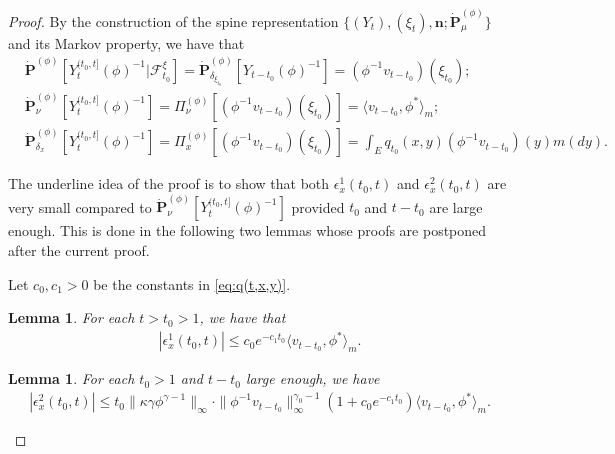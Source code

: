 \documentclass[12pt,a4paper]{amsart}
\newtheorem{lem}[thm]{Lemma}
\theoremstyle{definition}
\numberwithin{equation}{section}
\begin{document}
\begin{proof}
By the construction of the spine representation $\{(Y_t), (\xi_t),\mathbf n; \dot {\mathbf P}^{(\phi)}_\mu\}$ and its Markov property, we have that
\begin{align}
	\label{eq: some equations for PY-1-1}
	&\dot{\mathbf P}^{(\phi)} [Y_t^{(t_0,t]}(\phi)^{-1}|\mathscr F^\xi_{t_0}]
   = \dot{\mathbf P}_{\delta_{\xi_{t_0}}}^{(\phi)}  [Y_{t-t_0}(\phi)^{-1}]
   = (\phi^{-1}v_{t-t_0})(\xi_{t_0});
	\\ \label{eq: some equations for PY-1-2}
	&\dot{\mathbf P}_\nu^{(\phi)}[Y_t^{(t_0,t]}(\phi)^{-1}]
   = \Pi_{\nu}^{(\phi)}[(\phi^{-1}v_{t-t_0})(\xi_{t_0}) ]
   = \langle v_{t-t_0},\phi^* \rangle_m;
	\\ \label{eq: some equations for PY-1-3}
	&\dot{\mathbf P}_{\delta_x}^{(\phi)}[Y_t^{(t_0,t]}(\phi)^{-1}]
   = \Pi_x^{(\phi)}[(\phi^{-1}v_{t-t_0})(\xi_{t_0}) ]
   = \int_E  q_{t_0}(x,y)(\phi^{-1}v_{t-t_0})(y) m(dy).
\end{align}

The underline idea of the proof is to show that both $\epsilon_x^1(t_0,t)$ and $\epsilon_x^2(t_0,t)$ are very small compared to $\dot {\mathbf P}_\nu^{(\phi)}[Y_t^{(t_0,t]}(\phi)^{-1}]$ provided $t_0$ and $t- t_0$ are large enough.
This is done in the following two lemmas whose proofs are postponed after the current proof.


Let $c_0, c_1>0$ be the constants in \eqref{eq:q(t,x,y)}.
\begin{lem}
  \label{lem:bound_for_epsilon1}
  For each $t > t_0 > 1$, we have that
  \begin{align}
    |\epsilon_x^1(t_0,t)|
    \leq c_0 e^{-c_1 t_0}\langle v_{t-t_0},\phi^* \rangle_m.
  \end{align}
\end{lem}

\begin{lem}
  \label{lem:upperbound_of_epsilon-2}
  For each $t_0 > 1$ and $t - t_0$ large enough, we have
  \begin{align}
    \label{eq:upperbound_of_epsilon-2}
    |\epsilon_x^2(t_0,t)|
    \leq t_0\|\kappa\gamma\phi^{\gamma - 1}\|_{\infty} \cdot \|\phi^{-1}v_{t-t_0}\|^{\gamma_0-1}_\infty (1+c_0 e^{-c_1 t_0}) \langle v_{t-t_0},\phi^* \rangle_m.
  \end{align}
\end{lem}


\end{proof}
\end{document}
